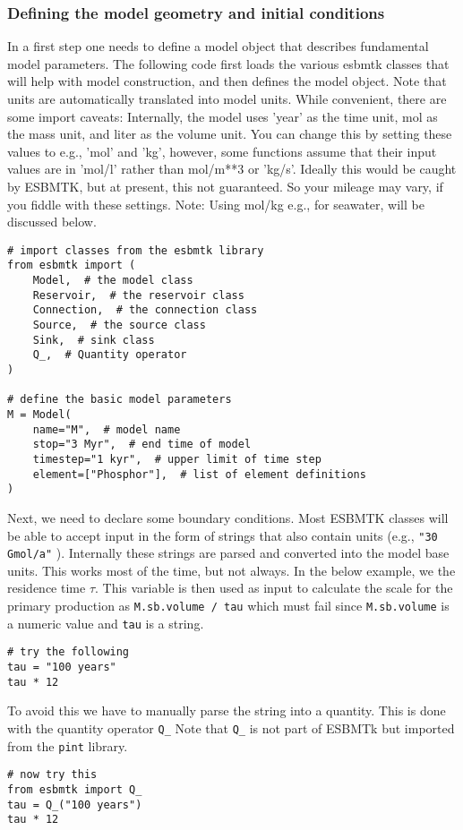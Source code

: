 \documentclass[11pt]{article}
\begin{document}
\subsubsection{Defining the model geometry and initial conditions}
\label{sec:org8672279}
In a first step one needs to define a model object that describes fundamental model parameters. The following code first loads the various esbmtk classes that will help with model construction, and then defines the model object. Note that units are automatically translated into model units. While convenient, there are some import caveats: 
Internally, the model uses 'year' as the time unit, mol as the mass unit, and liter as the volume unit. You can change this by setting these values to e.g., 'mol' and 'kg', however, some functions assume that their input values are in 'mol/l' rather than mol/m**3 or 'kg/s'. Ideally this would be caught by ESBMTK, but at present, this not guaranteed. So your mileage may vary, if you fiddle with these settings.  Note: Using mol/kg e.g., for seawater, will be discussed below.
\begin{verbatim}
# import classes from the esbmtk library
from esbmtk import (
    Model,  # the model class
    Reservoir,  # the reservoir class
    Connection,  # the connection class
    Source,  # the source class
    Sink,  # sink class
    Q_,  # Quantity operator
)

# define the basic model parameters
M = Model(
    name="M",  # model name
    stop="3 Myr",  # end time of model
    timestep="1 kyr",  # upper limit of time step
    element=["Phosphor"],  # list of element definitions
)
\end{verbatim}

Next, we need to declare some boundary conditions. Most ESBMTK classes will be able to accept input in the form of strings that also contain units (e.g., \texttt{"30 Gmol/a"} ). Internally these strings are parsed and converted into the model base units. This works most of the time, but not always. In the below example, we the residence time \(\tau\).  This variable is then used as input to calculate the scale for the primary production as \texttt{M.sb.volume / tau} which must fail since \texttt{M.sb.volume} is a numeric value and \texttt{tau} is a string. 
\begin{verbatim}
# try the following
tau = "100 years"
tau * 12
\end{verbatim}

To avoid this we have to manually parse the string into a quantity. This is done with the quantity operator \texttt{Q\_} Note that \texttt{Q\_} is not part of ESBMTk but imported from the \texttt{pint} library. 
\begin{verbatim}
# now try this
from esbmtk import Q_
tau = Q_("100 years")
tau * 12
\end{verbatim}
\end{document}
